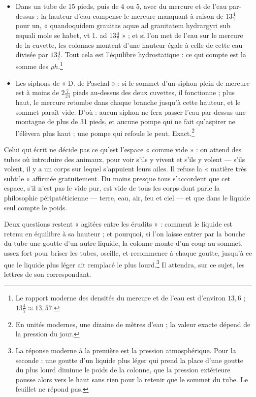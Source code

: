 \documentclass[11pt,a4paper]{article}
\begin{document}
\begin{itemize}
    doctrine des esprits prédisait.\footnote{$2\frac{7}{24}\times 13\frac47 =
    31{,}10$, en accord avec $31\frac19 = 31{,}11$ ; et le vin, plus haut, est plus
    léger que l'eau, de densité relative $\approx 0{,}98$ selon ces nombres (calcul
    de cette lecture).}
  \item Dans un tube de 15 pieds, puis de 4 ou 5, avec du mercure et de l'eau
    par-dessus : la hauteur d'eau compense le mercure manquant à raison de
    $13\frac47$ pour un, « quandoquidem grauitas aquæ ad grauitatem hydrargyri sub
    æquali mole se habet, vt 1. ad $13\frac47$ » ; et si l'on met de l'eau sur le
    mercure de la cuvette, les colonnes montent d'une hauteur égale à celle de
    cette eau divisée par $13\frac47$. Tout cela est l'équilibre hydrostatique :
    ce qui compte est la somme des $\rho h$.\footnote{Le rapport moderne des
    densités du mercure et de l'eau est d'environ $13{,}6$ ; $13\frac47 \approx
    13{,}57$.}
  \item Les siphons de « D. de Paschal » : si le sommet d'un siphon plein de
    mercure est à moins de $2\frac{7}{24}$ pieds au-dessus des deux cuvettes, il
    fonctionne ; plus haut, le mercure retombe dans chaque branche jusqu'à cette
    hauteur, et le sommet paraît vide. D'où : aucun siphon ne fera passer l'eau
    par-dessus une montagne de plus de 31 pieds, et aucune pompe qui ne fait
    qu'aspirer ne l'élèvera plus haut ; une pompe qui refoule le peut.
    Exact.\footnote{En unités modernes, une dizaine de mètres d'eau ; la valeur
    exacte dépend de la pression du jour.}
\end{itemize}

Celui qui écrit ne décide pas ce qu'est l'espace « comme vide » : on attend des
tubes où introduire des animaux, pour voir s'ils y vivent et s'ils y volent — s'ils
volent, il y a un corps sur lequel s'appuient leurs ailes. Il refuse la « matière
très subtile » affirmée gratuitement. Du moins presque tous s'accordent que cet espace,
s'il n'est pas le vide pur, est vide de tous les corps dont parle la philosophie
péripatéticienne — terre, eau, air, feu et ciel — et que dans le liquide seul
compte le poids.

Deux questions restent « agitées entre les érudits » : comment le liquide est
retenu en équilibre à sa hauteur ; et pourquoi, si l'on laisse entrer par la
bouche du tube une goutte d'un autre liquide, la colonne monte d'un coup au
sommet, assez fort pour briser les tubes, oscille, et recommence à chaque goutte,
jusqu'à ce que le liquide plus léger ait remplacé le plus lourd.\footnote{La
réponse moderne à la première est la pression atmosphérique. Pour la seconde :
une goutte d'un liquide plus léger qui prend la place d'une goutte du plus lourd
diminue le poids de la colonne, que la pression extérieure pousse alors vers le
haut sans rien pour la retenir que le sommet du tube. Le feuillet ne répond pas.}
Il attendra, sur ce sujet, les lettres de son correspondant.
\end{document}

